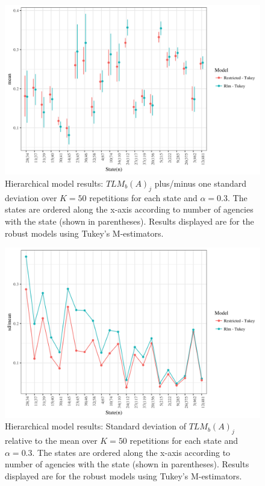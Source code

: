 \documentclass[ba]{imsart}
\begin{document}
 
\begin{figure}[t]
\includegraphics[width=7in]{hier_ave_tlm_state.png}
\caption{Hierarchical model results: ${TLM}_b(A)_{j}$  plus/minus one standard deviation over $K = 50$ repetitions for each state and $\alpha = 0.3$. The states are ordered along the x-axis according to number of agencies with the state (shown in parentheses). Results displayed are for the robust models using Tukey's M-estimators.}
\label{fig:hierTLMstate}
\end{figure}

\begin{figure}[t]
\includegraphics[width=7in]{hier_sd_tlm_state.png}
\caption{Hierarchical model results: Standard deviation of ${TLM}_b(A)_{j}$  relative to the mean over $K = 50$ repetitions for each state and $\alpha = 0.3$. The states are ordered along the x-axis according to number of agencies with the state (shown in parentheses). Results displayed are for the robust models using Tukey's M-estimators.}
\label{fig:hierTLMstateSD}
\end{figure}
\end{document}
